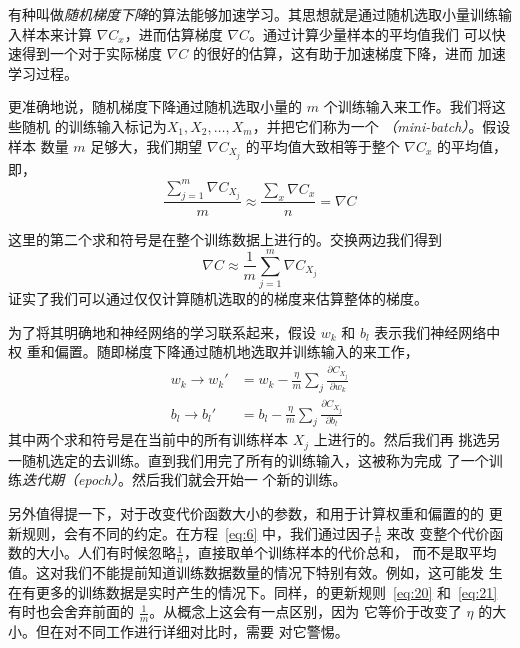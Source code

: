 有种叫做\emph{随机梯度下降}的算法能够加速学习。其思想就是通过随机选取小量训练输
入样本来计算 $\nabla C_x$，进而估算梯度 $\nabla C$。通过计算少量样本的平均值我们
可以快速得到一个对于实际梯度 $\nabla C$ 的很好的估算，这有助于加速梯度下降，进而
加速学习过程。

更准确地说，随机梯度下降通过随机选取小量的 $m$ 个训练输入来工作。我们将这些随机
的训练输入标记为$X_1, X_2, \ldots, X_m$，并把它们称为一个%
\emph{\minibatch{}\index{\minibatch}（\emph{mini-batch}）}。假设样本
数量 $m$ 足够大，我们期望 $\nabla C_{X_j}$ 的平均值大致相等于整个 $\nabla C_x$
的平均值，即，
\begin{equation}
  \frac{\sum_{j=1}^m \nabla C_{X_{j}}}{m} \approx \frac{\sum_x \nabla C_x}{n} = \nabla C
  \label{eq:18}\tag{18}
\end{equation}

这里的第二个求和符号是在整个训练数据上进行的。交换两边我们得到
\begin{equation}
  \nabla C \approx \frac{1}{m} \sum_{j=1}^m \nabla C_{X_{j}}
  \label{eq:19}\tag{19}
\end{equation}
证实了我们可以通过仅仅计算随机选取的\minibatch{}的梯度来估算整体的梯度。

为了将其明确地和神经网络的学习联系起来，假设 $w_k$ 和 $b_l$ 表示我们神经网络中权
重和偏置。随即梯度下降通过随机地选取并训练输入的\minibatch{}来工作，
\begin{align}
  \label{eq:20}w_k \rightarrow w_k' &= w_k-\frac{\eta}{m}
                                      \sum_j \frac{\partial C_{X_j}}{\partial w_k}
                                      \tag{20}\\
  \label{eq:21}b_l \rightarrow b_l' &= b_l-\frac{\eta}{m}
                                      \sum_j \frac{\partial C_{X_j}}{\partial b_l}
                                      \tag{21}
\end{align}
其中两个求和符号是在当前\minibatch{}中的所有训练样本 $X_j$ 上进行的。然后我们再
挑选另一随机选定的\minibatch{}去训练。直到我们用完了所有的训练输入，这被称为完成
了一个训练\emph{迭代期（\emph{epoch}）}。然后我们就会开始一
个新的训练\epoch{}。

另外值得提一下，对于改变代价函数大小的参数，和用于计算权重和偏置的\minibatch{}的
更新规则，会有不同的约定。在方程~\eqref{eq:6} 中，我们通过因子$\frac{1}{n}$ 来改
变整个代价函数的大小。人们有时候忽略$\frac{1}{n}$，直接取单个训练样本的代价总和，
而不是取平均值。这对我们不能提前知道训练数据数量的情况下特别有效。例如，这可能发
生在有更多的训练数据是实时产生的情况下。同样，\minibatch{}的更新规则~\eqref{eq:20}
和~\eqref{eq:21} 有时也会舍弃前面的 $\frac{1}{m}$。从概念上这会有一点区别，因为
它等价于改变了\learningrate{} $\eta$ 的大小。但在对不同工作进行详细对比时，需要
对它警惕。

